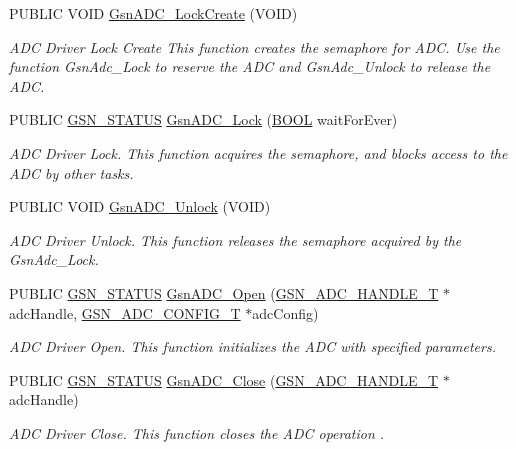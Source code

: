 \begin{DoxyCompactItemize}
\item 
PUBLIC VOID \hyperlink{a00643_gab7891ae2a7fb8ec386a686c3cc80895a}{GsnADC\_\-LockCreate} (VOID)
\begin{DoxyCompactList}\small\item\em ADC Driver Lock Create This function creates the semaphore for ADC. Use the function GsnAdc\_\-Lock to reserve the ADC and GsnAdc\_\-Unlock to release the ADC. \end{DoxyCompactList}\item 
PUBLIC \hyperlink{a00660_gada5951904ac6110b1fa95e51a9ddc217}{GSN\_\-STATUS} \hyperlink{a00643_gab45b8c7fc60c498bcca45dd93db4c94e}{GsnADC\_\-Lock} (\hyperlink{a00660_ga1f04022c0a182c51c059438790ea138c}{BOOL} waitForEver)
\begin{DoxyCompactList}\small\item\em ADC Driver Lock. This function acquires the semaphore, and blocks access to the ADC by other tasks. \end{DoxyCompactList}\item 
PUBLIC VOID \hyperlink{a00643_gaf67c439ea766aac8b8667664015d3256}{GsnADC\_\-Unlock} (VOID)
\begin{DoxyCompactList}\small\item\em ADC Driver Unlock. This function releases the semaphore acquired by the GsnAdc\_\-Lock. \end{DoxyCompactList}\item 
PUBLIC \hyperlink{a00660_gada5951904ac6110b1fa95e51a9ddc217}{GSN\_\-STATUS} \hyperlink{a00643_gaacf2fdb41466506928299a106b96def3}{GsnADC\_\-Open} (\hyperlink{a00024}{GSN\_\-ADC\_\-HANDLE\_\-T} $\ast$adcHandle, \hyperlink{a00023}{GSN\_\-ADC\_\-CONFIG\_\-T} $\ast$adcConfig)
\begin{DoxyCompactList}\small\item\em ADC Driver Open. This function initializes the ADC with specified parameters. \end{DoxyCompactList}\item 
PUBLIC \hyperlink{a00660_gada5951904ac6110b1fa95e51a9ddc217}{GSN\_\-STATUS} \hyperlink{a00643_gaac999315de0fc641a16931aaf7894e99}{GsnADC\_\-Close} (\hyperlink{a00024}{GSN\_\-ADC\_\-HANDLE\_\-T} $\ast$adcHandle)
\begin{DoxyCompactList}\small\item\em ADC Driver Close. This function closes the ADC operation . \end{DoxyCompactList}\item 

\end{DoxyCompactItemize}
